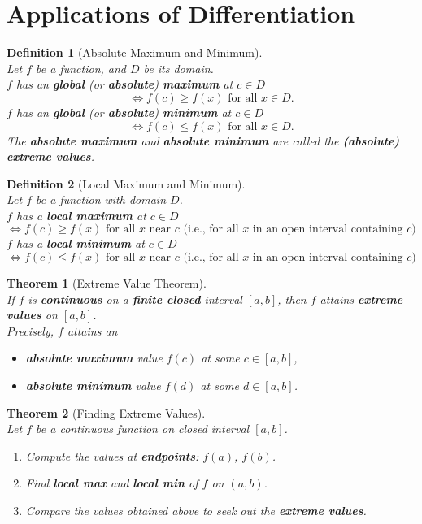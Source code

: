 \documentclass[12pt]{article}
\newtheorem{definition}{Definition}[section]
\newtheorem{theorem}{Theorem}[section]
\theoremstyle{definition}
\begin{document}
\section{Applications of Differentiation}
\begin{definition}[Absolute Maximum and Minimum]
\hfill\\
\normalfont Let $f$ be a function, and $D$ be its domain.\\
$f$ has an \textbf{global} (or \textbf{absolute}) \textbf{maximum} at $c \in D$
\[\Leftrightarrow f(c) \geq f(x) \text{ for all }x \in D.\]
$f$ has an \textbf{global} (or \textbf{absolute}) \textbf{minimum} at $c \in D$
\[\Leftrightarrow f(c) \leq f(x) \text{ for all }x \in D.\]
The \textbf{absolute maximum} and \textbf{absolute minimum} are called the \textbf{(absolute) extreme values}.
\end{definition}
\begin{definition}[Local Maximum and Minimum]
\hfill\\
\normalfont Let $f$ be a function with domain $D$.\\
$f$ has a \textbf{local maximum} at $c \in D$
\[ \Leftrightarrow f(c) \geq f(x)\text{ for all }x \text{ near }c\text{ (i.e., for all }x\text{ in an open interval containing }c)\]
$f$ has a \textbf{local minimum} at $c \in D$
\[\Leftrightarrow f(c) \leq f(x)\text{ for all }x\text{ near }c\text{ (i.e., for all }x\text{ in an open interval containing }c)\]
\end{definition}
\begin{theorem}[Extreme Value Theorem]
\hfill\\
\normalfont If $f$ is \textbf{continuous} on a \textbf{finite closed} interval $[a,b]$, then $f$ attains \textbf{extreme values} on $[a,b]$.\\
Precisely, $f$ attains an
\begin{itemize}
\item \textbf{absolute maximum} value $f(c)$ at some $c\in[a,b]$,
\item \textbf{absolute minimum} value $f(d)$ at some $d\in[a,b]$.
\end{itemize}
\end{theorem}
\begin{theorem}[Finding Extreme Values]
\hfill\\
\normalfont Let $f$ be a continuous function on closed interval $[a, b]$.
\begin{enumerate}
\item Compute the values at \textbf{endpoints}: $f(a)$, $f(b)$.
\item Find \textbf{local max} and \textbf{local min} of $f$ on $(a,b)$.
\item Compare the values obtained above to seek out the \textbf{extreme values}.
\end{enumerate}
\end{theorem}
\end{document}
